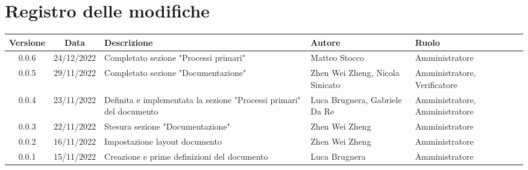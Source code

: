 \section*{Registro delle modifiche}
\begin{center}
\renewcommand\tabularxcolumn[1]{>{\Centering}m{#1}}
\begin{tabularx}{\textwidth}{| c | c | X | X | X |} 
\hline
 \textbf{Versione} & \textbf{Data} & \textbf{Descrizione} & \textbf{Autore} & \textbf{Ruolo}\\
 \hline
 0.0.6 & 24/12/2022 & Completato sezione "Processi primari" & Matteo Stocco & Amministratore\\
 \hline
 0.0.5 & 29/11/2022 & Completato sezione "Documentazione" & Zhen Wei Zheng, Nicola Sinicato & Amministratore, Verificatore\\
 \hline
 0.0.4 & 23/11/2022 &  Definita e implementata la sezione "Processi primari" del documento & Luca Brugnera, Gabriele Da Re & Amministratore, Amministratore\\
 \hline
 0.0.3 & 22/11/2022 & Stesura sezione "Documentazione" & Zhen Wei Zheng & Amministratore\\
 \hline
 0.0.2 & 16/11/2022 & Impostazione layout documento & Zhen Wei Zheng & Amministratore\\
 \hline
 0.0.1 & 15/11/2022 & Creazione e prime definizioni del documento & Luca Brugnera & Amministratore\\
 \hline
\end{tabularx}
\end{center}
